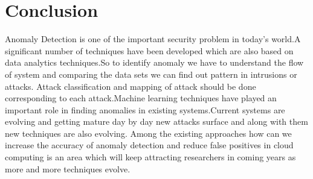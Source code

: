 \chapter{Conclusion}
\label{chap:conclusion}
Anomaly Detection is one of the important security problem in today's world.A significant number of techniques have been developed which are also based on data analytics techniques.So to identify anomaly we have to understand the flow of system and comparing the data sets we can find out pattern in intrusions or attacks. Attack classification and mapping of attack should be done corresponding to each attack.Machine learning techniques have played an important role in finding anomalies in existing systems.Current systems are evolving and getting mature day by day new attacks surface and along with them new techniques are also evolving. Among the existing approaches how can we increase the accuracy of anomaly detection and reduce false positives in cloud computing is an area which will keep attracting researchers in coming years as more and more techniques evolve.